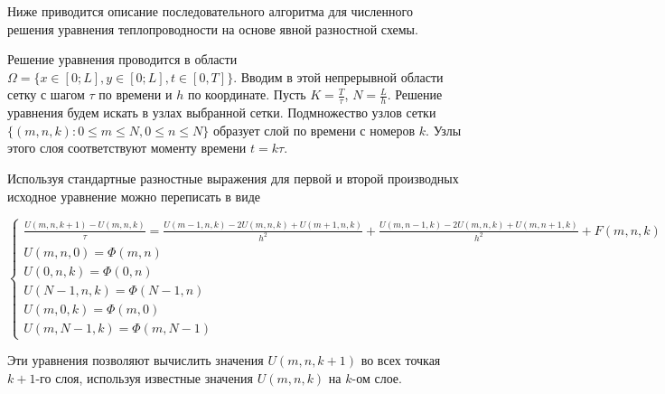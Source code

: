 \documentclass[11pt, oneside, a4paper]{article}
\begin{document}
Ниже приводится описание последовательного алгоритма для численного решения уравнения теплопроводности на основе явной разностной схемы.

Решение уравнения проводится в области $\Omega = \{x \in [0; L], y \in [0; L], t \in [0, T]\}$. Вводим в этой непрерывной области сетку с шагом $\tau$ по времени и $h$ по координате. Пусть $K = \frac{T}{\tau}$, $N = \frac{L}{h}$. Решение уравнения будем искать в узлах выбранной сетки. Подмножество узлов сетки $\{(m, n, k) : 0 \le m \le N, 0 \le n \le N\}$ образует слой по времени с номеров $k$. Узлы этого слоя соответствуют моменту времени $t = k \tau$.

Используя стандартные разностные выражения для первой и второй производных исходное уравнение можно переписать в виде

\begin{displaymath}
\left\{\begin{array}{l}
\frac{U(m, n, k+1) - U(m, n, k)}{\tau} = \frac{U(m-1, n, k) - 2U(m, n, k) + U(m+1, n, k)}{h^2} + \frac{U(m, n-1, k) - 2U(m, n, k) + U(m, n+1, k)}{h^2} + F(m, n, k) \\
U(m, n, 0) = \Phi (m, n) \\
U(0, n, k) = \Phi (0, n) \\
U(N-1, n, k) = \Phi (N-1, n) \\
U(m, 0, k) = \Phi(m, 0) \\
U(m, N-1, k) = \Phi(m, N-1)
\end{array}\right.
\end{displaymath}

Эти уравнения позволяют вычислить значения $U(m, n, k+1)$ во всех точкая $k+1$-го слоя, используя известные значения $U(m, n, k)$ на $k$-ом слое.
\end{document}
